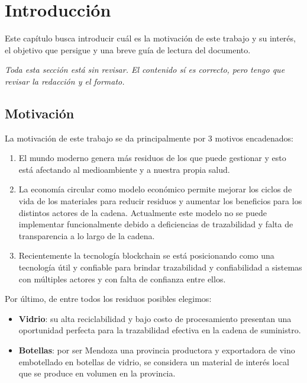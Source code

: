 \chapter[Introducción]{Introducción}
\label{cp:introduction}

\parindent0pt


Este capítulo busca introducir cuál es la motivación de este trabajo y su interés, el objetivo que persigue y una breve guía de lectura del documento. 

\begin{block}[todo]
    \textit{Toda esta sección está sin revisar. El contenido sí es correcto, pero tengo que revisar la redacción y el formato.}
\end{block}

\section{Motivación}

La motivación de este trabajo se da principalmente por 3 motivos encadenados:

\begin{enumerate}
	\item El mundo moderno genera más residuos de los que puede gestionar y esto está afectando al medioambiente y a nuestra propia salud.
	\item La economía circular como modelo económico permite mejorar los ciclos de vida de los materiales para reducir residuos y aumentar los beneficios para los distintos actores de la cadena. Actualmente este modelo no se puede implementar funcionalmente debido a deficiencias de trazabilidad y falta de transparencia a lo largo de la cadena.
	\item Recientemente la tecnología blockchain se está posicionando como una tecnología útil y confiable para brindar trazabilidad y confiabilidad a sistemas con múltiples actores y con falta de confianza entre ellos.
\end{enumerate}

Por último, de entre todos los residuos posibles elegimos:

\begin{itemize}
	\item \textbf{Vidrio}: su alta reciclabilidad y bajo costo de procesamiento \cite{prodvidrio2024verallia} presentan una oportunidad perfecta para la trazabilidad efectiva en la cadena de suministro.
	\item \textbf{Botellas}: por ser Mendoza una provincia productora y exportadora de vino embotellado en botellas de vidrio, se considera un material de interés local que se produce en volumen en la provincia.
\end{itemize}

